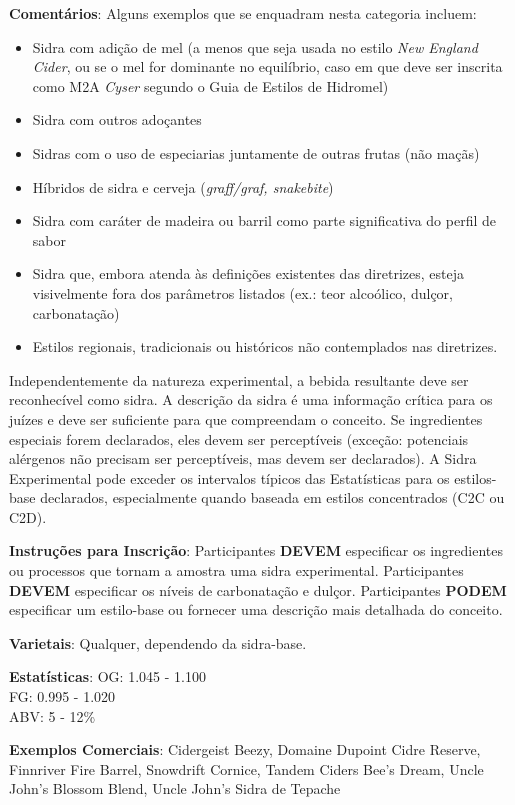 \textbf{Comentários}: Alguns exemplos que se enquadram nesta categoria incluem:
\begin{itemize}[leftmargin=3mm]
\item Sidra com adição de mel (a menos que seja usada no estilo \textit{New England Cider}, ou se o mel for dominante no equilíbrio, caso em que deve ser inscrita como M2A \textit{Cyser} segundo o Guia de Estilos de Hidromel)
\item Sidra com outros adoçantes
\item Sidras com o uso de especiarias juntamente de outras frutas (não maçãs)
\item Híbridos de sidra e cerveja (\textit{graff/graf, snakebite})
\item Sidra com caráter de madeira ou barril como parte significativa do perfil de sabor
\item Sidra que, embora atenda às definições existentes das diretrizes, esteja visivelmente fora dos parâmetros listados (ex.: teor alcoólico, dulçor, carbonatação)
\item Estilos regionais, tradicionais ou históricos não contemplados nas diretrizes.
\end{itemize}
Independentemente da natureza experimental, a bebida resultante deve ser reconhecível como sidra. A descrição da sidra é uma informação crítica para os juízes e deve ser suficiente para que compreendam o conceito. Se ingredientes especiais forem declarados, eles devem ser perceptíveis (exceção: potenciais alérgenos não precisam ser perceptíveis, mas devem ser declarados).  
A Sidra Experimental pode exceder os intervalos típicos das Estatísticas para os estilos-base declarados, especialmente quando baseada em estilos concentrados (C2C ou C2D).

\textbf{Instruções para Inscrição}: Participantes \textbf{DEVEM} especificar os ingredientes ou processos que tornam a amostra uma sidra experimental. Participantes \textbf{DEVEM} especificar os níveis de carbonatação e dulçor. Participantes \textbf{PODEM} especificar um estilo-base ou fornecer uma descrição mais detalhada do conceito.

\textbf{Varietais}: Qualquer, dependendo da sidra-base.

\textbf{Estatísticas}: OG: 1.045 - 1.100 \\
\phantom{ } \hspace{16.5mm} FG: 0.995 - 1.020 \\
\phantom{ } \hspace{16.5mm} ABV: 5 - 12\%

\textbf{Exemplos Comerciais}: Cidergeist Beezy, Domaine Dupoint Cidre Reserve, Finnriver Fire Barrel, Snowdrift Cornice, Tandem Ciders Bee's Dream, Uncle John's Blossom Blend, Uncle John's Sidra de Tepache
